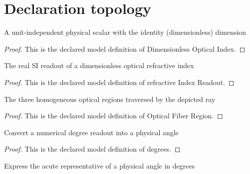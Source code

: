 \section{Declaration topology}
\begin{definition}
  \label{def:physics:phyx-mini-0098:phyxminiproblems-problemphyxmini0098-dimensionlessopticalindex}
  A unit-independent physical scalar with the identity (dimensionless) dimension
\end{definition}
\begin{proof}
  This is the declared model definition of Dimensionless Optical Index.
\end{proof}
\begin{definition}
  \label{def:physics:phyx-mini-0098:phyxminiproblems-problemphyxmini0098-refractiveindexreadout}
  The real SI readout of a dimensionless optical refractive index
\end{definition}
\begin{proof}
  This is the declared model definition of refractive Index Readout.
\end{proof}
\begin{definition}
  \label{def:physics:phyx-mini-0098:phyxminiproblems-problemphyxmini0098-opticalfiberregion}
  The three homogeneous optical regions traversed by the depicted ray
\end{definition}
\begin{proof}
  This is the declared model definition of Optical Fiber Region.
\end{proof}
\begin{definition}[degrees]
  \label{def:physics:phyx-mini-0098:phyxminiproblems-problemphyxmini0098-degrees}
  Convert a numerical degree readout into a physical angle
\end{definition}
\begin{proof}
  This is the declared model definition of degrees.
\end{proof}
\begin{definition}
  \label{def:physics:phyx-mini-0098:phyxminiproblems-problemphyxmini0098-degreereadout}
  Express the acute representative of a physical angle in degrees
\end{definition}
